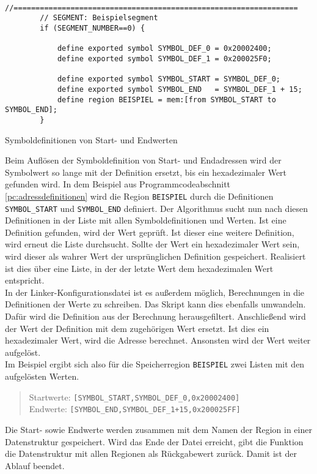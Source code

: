 \begin{listing}[H]
	\begin{verbatim}
		//=================================================================
		// SEGMENT: Beispielsegment
		if (SEGMENT_NUMBER==0) {
			
			define exported symbol SYMBOL_DEF_0 = 0x20002400;
			define exported symbol SYMBOL_DEF_1 = 0x200025F0;
			
			define exported symbol SYMBOL_START = SYMBOL_DEF_0;
			define exported symbol SYMBOL_END   = SYMBOL_DEF_1 + 15;
			define region BEISPIEL = mem:[from SYMBOL_START to SYMBOL_END];
		}
	\end{verbatim}
	\caption{Symboldefinitionen von Start- und Endwerten}
	\label{pc:adressdefinitionen}
\end{listing}

Beim Auflösen der Symboldefinition von Start- und Endadressen wird der Symbolwert so lange mit der Definition ersetzt, bis ein hexadezimaler Wert gefunden wird.
In dem Beispiel aus Programmcodeabschnitt \ref{pc:adressdefinitionen} wird die Region \verb*|BEISPIEL| durch die Definitionen \verb*|SYMBOL_START| und \verb*|SYMBOL_END| definiert.
Der Algorithmus sucht nun nach diesen Definitionen in der Liste mit allen Symboldefinitionen und Werten.
Ist eine Definition gefunden, wird der Wert geprüft.
Ist dieser eine weitere Definition, wird erneut die Liste durchsucht.
Sollte der Wert ein hexadezimaler Wert sein, wird dieser als wahrer Wert der ursprünglichen Definition gespeichert.
Realisiert ist dies über eine Liste, in der der letzte Wert dem hexadezimalen Wert entspricht. \\

In der Linker-Konfigurationsdatei ist es außerdem möglich, Berechnungen in die Definitionen der Werte zu schreiben.
Das Skript kann dies ebenfalls umwandeln.
Dafür wird die Definition aus der Berechnung herausgefiltert.
Anschließend wird der Wert der Definition mit dem zugehörigen Wert ersetzt.
Ist dies ein hexadezimaler Wert, wird die Adresse berechnet.
Ansonsten wird der Wert weiter aufgelöst.\\

Im Beispiel ergibt sich also für die Speicherregion \verb*|BEISPIEL| zwei Listen mit den aufgelösten Werten.
\begin{quote}
	\centering
	Startwerte: \verb*|[SYMBOL_START,SYMBOL_DEF_0,0x20002400]| \\
	Endwerte: \verb*|[SYMBOL_END,SYMBOL_DEF_1+15,0x200025FF]|
\end{quote}
Die Start- sowie Endwerte werden zusammen mit dem Namen der Region in einer Datenstruktur gespeichert.
Wird das Ende der Datei erreicht, gibt die Funktion die Datenstruktur mit allen Regionen als Rückgabewert zurück.
Damit ist der Ablauf beendet.

